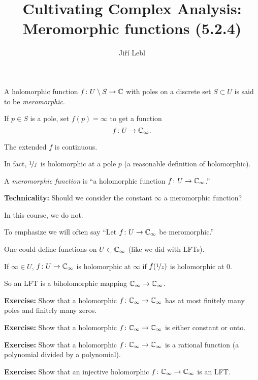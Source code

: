 \documentclass[10pt,aspectratio=169]{beamer}
\author{Ji\v{r}\'i Lebl}
\institute[OSU]{%
Departemento pri Matematiko de Oklahoma {\^S}tata Universitato}
\title{Cultivating Complex Analysis:\\%
Meromorphic functions (5.2.4)}
\date{}
\begin{document}
\begin{frame}
\titlepage
\end{frame}

\begin{frame}
\begin{definition}
A holomorphic function $f \colon U \setminus S \to {\mathbb{C}}$ with poles on a
discrete set $S \subset U$ is said to be \emph{meromorphic}.
\end{definition}

\pause

If $p \in S$ is a pole, set
$f(p) = \infty$ to get a function
\[
f \colon U \to {\mathbb{C}}_{\infty} .
\]

\pause
The extended $f$ is continuous.

\pause
\medskip

In fact, $\nicefrac{1}{f}$ is holomorphic at a pole $p$
\quad
(a reasonable definition of holomorphic).

\pause
\medskip

A \emph{meromorphic function} is
``a holomorphic function $f \colon U \to {\mathbb{C}}_{\infty}$.''

\pause
\medskip

\textbf{Technicality:} Should we consider the constant $\infty$
a meromorphic function?

\pause
In this course, we do not.

\pause
\medskip

To emphasize we will often say
``Let 
$f \colon U \to {\mathbb{C}}_\infty$ be meromorphic.''

\end{frame}

\begin{frame}

One could define functions on $U \subset {\mathbb{C}}_\infty$ (like we did with LFTs).

\pause
\medskip

If $\infty \in U$,
\quad
$f \colon U \to {\mathbb{C}}_\infty$ is holomorphic at $\infty$ if
$f(\nicefrac{1}{z})$ is holomorphic at $0$.

\pause
\medskip

So an LFT is a biholomorphic mapping ${\mathbb{C}}_\infty \to {\mathbb{C}}_\infty$.

\pause
\medskip

\textbf{Exercise:}
Show that a holomorphic $f \colon {\mathbb{C}}_\infty \to {\mathbb{C}}_\infty$ has
at most finitely many poles and finitely many zeros.

\pause
\medskip

\textbf{Exercise:}
Show that a holomorphic $f \colon {\mathbb{C}}_\infty \to {\mathbb{C}}_\infty$ is
either constant or onto.

\pause
\medskip

\textbf{Exercise:}
Show that a holomorphic $f \colon {\mathbb{C}}_\infty \to {\mathbb{C}}_\infty$ is a
rational function (a polynomial divided by a polynomial).

\pause
\medskip

\textbf{Exercise:}
Show that an injective holomorphic $f \colon {\mathbb{C}}_\infty \to {\mathbb{C}}_\infty$ is an
LFT\@.
\end{frame}
\end{document}
